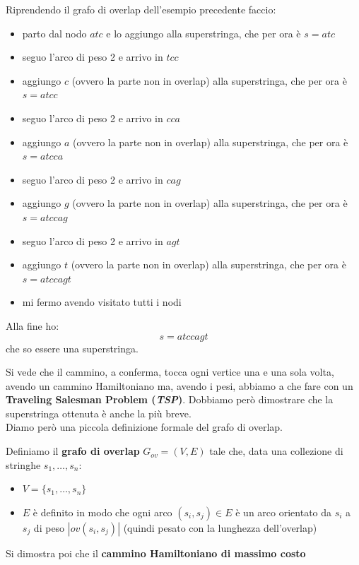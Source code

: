 \documentclass[a4paper,12pt, oneside]{book}
\begin{document}
\begin{esempio}
  Riprendendo il grafo di overlap dell'esempio precedente faccio:
  \begin{itemize}
    \item parto dal nodo $atc$ e lo aggiungo alla superstringa, che per ora è
    $s=atc$ 
    \item seguo l'arco di peso 2 e arrivo in $tcc$
    \item aggiungo $c$ (ovvero la parte non in overlap) alla superstringa, che
    per ora è $s=atcc$ 
    \item seguo l'arco di peso 2 e arrivo in $cca$
    \item aggiungo $a$ (ovvero la parte non in overlap) alla superstringa, che
    per ora è $s=atcca$
    \item seguo l'arco di peso 2 e arrivo in $cag$
    \item aggiungo $g$ (ovvero la parte non in overlap) alla superstringa, che
    per ora è $s=atccag$
    \item seguo l'arco di peso 2 e arrivo in $agt$
    \item aggiungo $t$ (ovvero la parte non in overlap) alla superstringa, che
    per ora è $s=atccagt$ 
    \item mi fermo avendo visitato tutti i nodi
  \end{itemize}
  Alla fine ho:
  \[s=atccagt\]
  che so essere una superstringa.
\end{esempio}
Si vede che il cammino, a conferma, tocca ogni vertice una e una sola volta,
avendo un cammino Hamiltoniano ma, avendo i pesi, abbiamo a che fare con un
\textbf{Traveling Salesman Problem (\textit{TSP})}. Dobbiamo però dimostrare che
la superstringa ottenuta è anche la più breve. \\
Diamo però una piccola definizione formale del grafo di overlap.
\begin{definizione}
  Definiamo il \textbf{grafo di overlap} $G_{ov}=(V,E)$ tale che, data una
  collezione di stringhe $s_1,\ldots,s_n$:
  \begin{itemize}
    \item $V=\{s_1,\ldots,s_n\}$
    \item $E$ è definito in modo che ogni arco $(s_i,s_j)\in E$ è un arco
    orientato da $s_i$ a $s_j$ di peso $|ov(s_i,s_j)|$ (quindi pesato con la
    lunghezza dell'overlap)
  \end{itemize}
\end{definizione}
Si dimostra poi che il \textbf{cammino Hamiltoniano di massimo costo}
\end{document}
